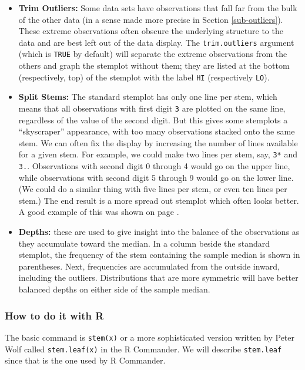 \documentclass[]{book}
\providecommand{\tightlist}{%
  \setlength{\itemsep}{0pt}\setlength{\parskip}{0pt}}
\numberwithin{equation}{chapter}
\numberwithin{figure}{chapter}
\theoremstyle{plain}
\theoremstyle{definition}
\theoremstyle{remark}
\theoremstyle{definition}
\theoremstyle{definition}
\theoremstyle{remark}
\begin{document}
\begin{itemize}
\tightlist
\item
  \textbf{Trim Outliers:} Some data sets have observations that fall far
  from the bulk of the other data (in a sense made more precise in
  Section \ref{sub-outliers}). These extreme observations often obscure
  the underlying structure to the data and are best left out of the data
  display. The \texttt{trim.outliers} argument (which is \texttt{TRUE}
  by default) will separate the extreme observations from the others and
  graph the stemplot without them; they are listed at the bottom
  (respectively, top) of the stemplot with the label \texttt{HI}
  (respectively \texttt{LO}).
\item
  \textbf{Split Stems:} The standard stemplot has only one line per
  stem, which means that all observations with first digit \texttt{3}
  are plotted on the same line, regardless of the value of the second
  digit. But this gives some stemplots a ``skyscraper'' appearance, with
  too many observations stacked onto the same stem. We can often fix the
  display by increasing the number of lines available for a given stem.
  For example, we could make two lines per stem, say, \texttt{3*} and
  \texttt{3.}. Observations with second digit 0 through 4 would go on
  the upper line, while observations with second digit 5 through 9 would
  go on the lower line. (We could do a similar thing with five lines per
  stem, or even ten lines per stem.) The end result is a more spread out
  stemplot which often looks better. A good example of this was shown on
  page \pageref{exa-stemleaf-multiple-lines-stem}.
\item
  \textbf{Depths:} these are used to give insight into the balance of
  the observations as they accumulate toward the median. In a column
  beside the standard stemplot, the frequency of the stem containing the
  sample median is shown in parentheses. Next, frequencies are
  accumulated from the outside inward, including the outliers.
  Distributions that are more symmetric will have better balanced depths
  on either side of the sample median.
\end{itemize}

\subsubsection{How to do it with R}\label{how-to-do-it-with-r-4}

The basic command is \texttt{stem(x)} or a more sophisticated version
written by Peter Wolf called \texttt{stem.leaf(x)} in the R Commander.
We will describe \texttt{stem.leaf} since that is the one used by R
Commander.
\end{document}
